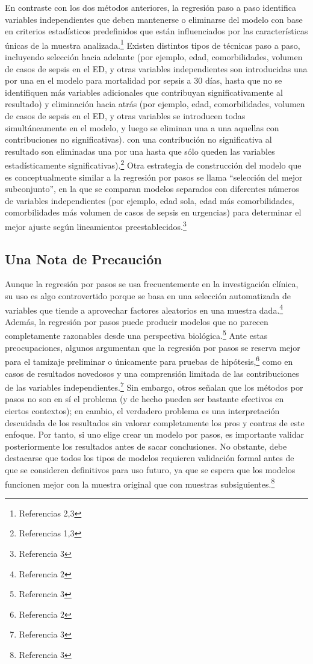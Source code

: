 \documentclass[12pt]{article}
\begin{document}
En contraste con los dos m\'etodos anteriores, la regresi\'on paso a paso identifica variables independientes que deben mantenerse o eliminarse del modelo con base en criterios estad\'isticos predefinidos que est\'an influenciados por las caracter\'isticas \'unicas de la muestra analizada.\footnote{Referencias 2,3} Existen distintos tipos de t\'ecnicas paso a paso, incluyendo selecci\'on hacia adelante (por ejemplo, edad, comorbilidades, volumen de casos de sepsis en el ED, y otras variables independientes son introducidas una por una en el modelo para mortalidad por sepsis a 30 d\'ias, hasta que no se identifiquen m\'as variables adicionales que contribuyan significativamente al resultado) y eliminaci\'on hacia atr\'as (por ejemplo, edad, comorbilidades, volumen de casos de sepsis en el ED, y otras variables se introducen todas simult\'aneamente en el modelo, y luego se eliminan una a una aquellas con contribuciones no significativas). con una contribuci\'on no significativa al resultado son eliminadas una por una hasta que s\'olo queden las variables estad\'isticamente significativas).\footnote{Referencias 1,3} Otra estrategia de construcci\'on del modelo que es conceptualmente similar a la regresi\'on por pasos se llama ``selecci\'on del mejor subconjunto'', en la que se comparan modelos separados con diferentes n\'umeros de variables independientes (por ejemplo, edad sola, edad m\'as comorbilidades, comorbilidades m\'as volumen de casos de sepsis en urgencias) para determinar el mejor ajuste seg\'un lineamientos preestablecidos.\footnote{Referencia 3}

\subsection*{Una Nota de Precauci\'on}

Aunque la regresi\'on por pasos se usa frecuentemente en la investigaci\'on cl\'inica, su uso es algo controvertido porque se basa en una selecci\'on automatizada de variables que tiende a aprovechar factores aleatorios en una muestra dada.\footnote{Referencia 2} Adem\'as, la regresi\'on por pasos puede producir modelos que no parecen completamente razonables desde una perspectiva biol\'ogica.\footnote{Referencia 3} Ante estas preocupaciones, algunos argumentan que la regresi\'on por pasos se reserva mejor para el tamizaje preliminar o \'unicamente para pruebas de hip\'otesis,\footnote{Referencia 2} como en casos de resultados novedosos y una comprensi\'on limitada de las contribuciones de las variables independientes.\footnote{Referencia 3} Sin embargo, otros se\~nalan que los m\'etodos por pasos no son en s\'i el problema (y de hecho pueden ser bastante efectivos en ciertos contextos); en cambio, el verdadero problema es una interpretaci\'on descuidada de los resultados sin valorar completamente los pros y contras de este enfoque. Por tanto, si uno elige crear un modelo por pasos, es importante validar posteriormente los resultados antes de sacar conclusiones. No obstante, debe destacarse que todos los tipos de modelos requieren validaci\'on formal antes de que se consideren definitivos para uso futuro, ya que se espera que los modelos funcionen mejor con la muestra original que con muestras subsiguientes.\footnote{Referencia 3}
\end{document}
